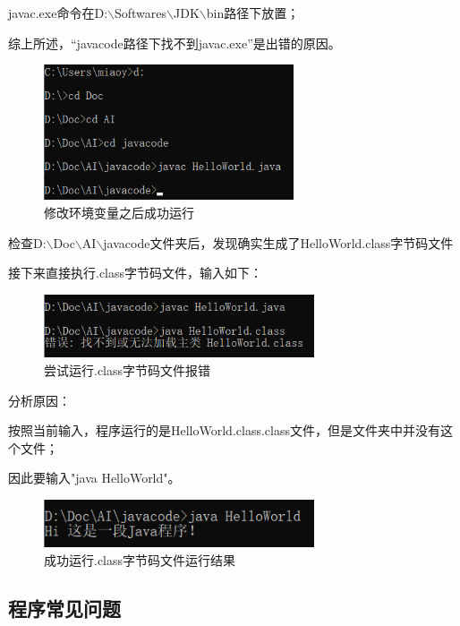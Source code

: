\documentclass{article}
\begin{document}
	javac.exe命令在D:$\backslash$Softwares$\backslash$JDK$\backslash$bin路径下放置；
	
	综上所述，“javacode路径下找不到javac.exe”\setlength{\parindent}{4em}是出错的原因。
	
	\begin{figure}[ht]
	\centering
	\includegraphics[height=40mm]{8.png}
	\caption{修改环境变量之后成功运行}
	\label{fig:label}
	\end{figure}	
	
	\setlength{\parindent}{2em}
	检查D:$\backslash$Doc$\backslash$AI$\backslash$javacode文件夹后，发现确实生成了HelloWorld.class字节码文件
	
	接下来直接执行.class字节码文件，输入如下：
	
	\begin{figure}[ht]
		\centering
		\includegraphics[width=80mm]{9.png}
		\caption{尝试运行.class字节码文件报错}
		\label{fig:label}
	\end{figure}	
	
	分析原因：
	
	\setlength{\parindent}{4em}
	按照当前输入，程序运行的是HelloWorld.class.class文件，但是文件夹中并没有这个文件；
	
	因此要输入"java HelloWorld"。
	
	\begin{figure}[ht]
		\centering
		\includegraphics[width=80mm]{10.png}
		\caption{成功运行.class字节码文件运行结果}
		\label{fig:label}
	\end{figure}
	
	\subsection{程序常见问题}
	
\end{document}
